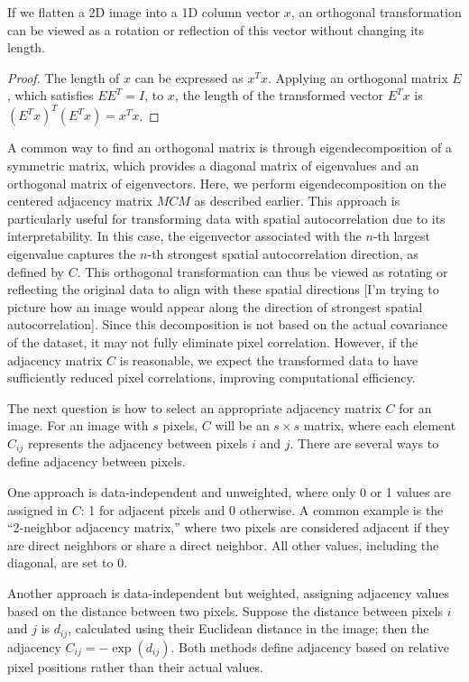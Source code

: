 \documentclass[12pt]{article}
\begin{document}
If we flatten a 2D image into a 1D column vector \( x \), an orthogonal transformation can be viewed as a rotation or reflection of this vector without changing its length.
\begin{proof}
  The length of \( x \) can be expressed as \( x^T x \). Applying an orthogonal matrix \( E \), which satisfies \( E E^T = I \), to \( x \), the length of the transformed vector \( E^T x \) is \( (E^T x)^T (E^T x) = x^T x \).
\end{proof}

A common way to find an orthogonal matrix is through eigendecomposition of a symmetric matrix, which provides a diagonal matrix of eigenvalues and an orthogonal matrix of eigenvectors. Here, we perform eigendecomposition on the centered adjacency matrix \( M C M \) as described earlier. This approach is particularly useful for transforming data with spatial autocorrelation due to its interpretability. In this case, the eigenvector associated with the \( n \)-th largest eigenvalue captures the \( n \)-th strongest spatial autocorrelation direction, as defined by \( C \). This orthogonal transformation can thus be viewed as rotating or reflecting the original data to align with these spatial directions [I'm trying to picture how an image would appear along the direction of strongest spatial autocorrelation]. Since this decomposition is not based on the actual covariance of the dataset, it may not fully eliminate pixel correlation. However, if the adjacency matrix \( C \) is reasonable, we expect the transformed data to have sufficiently reduced pixel correlations, improving computational efficiency.

The next question is how to select an appropriate adjacency matrix \( C \) for an image. For an image with \( s \) pixels, \( C \) will be an \( s \times s \) matrix, where each element \( C_{ij} \) represents the adjacency between pixels \( i \) and \( j \). There are several ways to define adjacency between pixels. 

One approach is data-independent and unweighted, where only 0 or 1 values are assigned in \( C \): 1 for adjacent pixels and 0 otherwise. A common example is the “2-neighbor adjacency matrix,” where two pixels are considered adjacent if they are direct neighbors or share a direct neighbor. All other values, including the diagonal, are set to 0.

Another approach is data-independent but weighted, assigning adjacency values based on the distance between two pixels. Suppose the distance between pixels \( i \) and \( j \) is \( d_{ij} \), calculated using their Euclidean distance in the image; then the adjacency \( C_{ij} = - \exp(d_{ij}) \). Both methods define adjacency based on relative pixel positions rather than their actual values.
\end{document}
